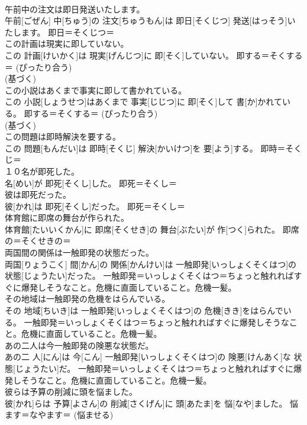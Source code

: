 \documentclass[8pt]{extreport}
\begin{document}
\begin{CJK}{UTF8}{min}
{\\	午前中の注文は即日発送いたします。	
\\	午前[ごぜん] 中[ちゅう]の 注文[ちゅうもん]は 即日[そくじつ] 発送[はっそう]いたします。	即日＝そくじつ＝ 
\\	この計画は現実に即していない。	
\\	この 計画[けいかく]は 現実[げんじつ]に 即[そく]していない。	即する＝そくする＝ (ぴったり合う) 
\\	(基づく) 
\\	この小説はあくまで事実に即して書かれている。	
\\	この 小説[しょうせつ]はあくまで 事実[じじつ]に 即[そく]して 書[か]かれている。	即する＝そくする＝ (ぴったり合う) 
\\	(基づく) 
\\	この問題は即時解決を要する。	
\\	この 問題[もんだい]は 即時[そくじ] 解決[かいけつ]を 要[よう]する。	即時＝そくじ＝ 
\\	１０名が即死した。	
\\	名[めい]が 即死[そくし]した。	即死＝そくし＝ 
\\	彼は即死だった。	
\\	彼[かれ]は 即死[そくし]だった。	即死＝そくし＝ 
\\	体育館に即席の舞台が作られた。	
\\	体育館[たいいくかん]に 即席[そくせき]の 舞台[ぶたい]が 作[つく]られた。	即席の＝そくせきの＝ 
\\	両国間の関係は一触即発の状態だった。	
\\	両国[りょうこく] 間[かん]の 関係[かんけい]は 一触即発[いっしょくそくはつ]の 状態[じょうたい]だった。	一触即発＝いっしょくそくはつ＝ちょっと触れればすぐに爆発しそうなこと。危機に直面していること。危機一髪。
\\	その地域は一触即発の危機をはらんでいる。	
\\	その 地域[ちいき]は 一触即発[いっしょくそくはつ]の 危機[きき]をはらんでいる。	一触即発＝いっしょくそくはつ＝ちょっと触れればすぐに爆発しそうなこと。危機に直面していること。危機一髪。
\\	あの二人は今一触即発の険悪な状態だ。	
\\	あの二 人[にん]は 今[こん] 一触即発[いっしょくそくはつ]の 険悪[けんあく]な 状態[じょうたい]だ。	一触即発＝いっしょくそくはつ＝ちょっと触れればすぐに爆発しそうなこと。危機に直面していること。危機一髪。
\\	彼らは予算の削減に頭を悩ました。	
\\	彼[かれ]らは 予算[よさん]の 削減[さくげん]に 頭[あたま]を 悩[なや]ました。	悩ます＝なやます＝ (悩ませる) 
}
\end{CJK}
\end{document}
